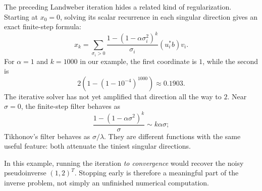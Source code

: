 The preceding Landweber iteration hides a related kind of regularization. Starting at $x_0=0$, solving its scalar recurrence in each singular direction gives an exact finite-step formula:
\[
 \boxed{
 x_k=\sum_{\sigma_i>0}
  \frac{1-(1-\alpha\sigma_i^2)^k}{\sigma_i}
  (u_i^*b)v_i .}
\]
For $\alpha=1$ and $k=1000$ in our example, the first coordinate is $1$, while the second is
\[
 2\left(1-\left(1-10^{-4}\right)^{1000}\right)
 \approx0.1903.
\]
The iterative solver has not yet amplified that direction all the way to $2$. Near $\sigma=0$, the finite-step filter behaves as
\[
 \frac{1-(1-\alpha\sigma^2)^k}{\sigma}
    \sim k\alpha\sigma;
\]
Tikhonov's filter behaves as $\sigma/\lambda$. They are different functions with the same useful feature: both attenuate the tiniest singular directions.

In this example, running the iteration \emph{to convergence} would recover the noisy pseudoinverse $(1,2)^T$. Stopping early is therefore a meaningful part of the inverse problem, not simply an unfinished numerical computation.
